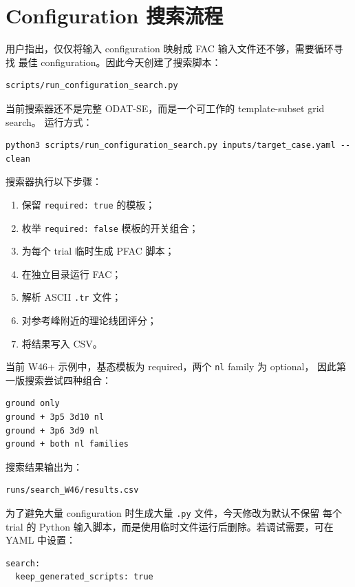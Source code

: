 \documentclass[11pt,a4paper]{article}
\begin{document}
\section{Configuration 搜索流程}

用户指出，仅仅将输入 configuration 映射成 FAC 输入文件还不够，需要循环寻找
最佳 configuration。因此今天创建了搜索脚本：

\begin{lstlisting}
scripts/run_configuration_search.py
\end{lstlisting}

当前搜索器还不是完整 ODAT-SE，而是一个可工作的 template-subset grid search。
运行方式：

\begin{lstlisting}
python3 scripts/run_configuration_search.py inputs/target_case.yaml --clean
\end{lstlisting}

搜索器执行以下步骤：

\begin{enumerate}
  \item 保留 \texttt{required: true} 的模板；
  \item 枚举 \texttt{required: false} 模板的开关组合；
  \item 为每个 trial 临时生成 PFAC 脚本；
  \item 在独立目录运行 FAC；
  \item 解析 ASCII \texttt{.tr} 文件；
  \item 对参考峰附近的理论线团评分；
  \item 将结果写入 CSV。
\end{enumerate}

当前 W46+ 示例中，基态模板为 required，两个 \texttt{nl} family 为 optional，
因此第一版搜索尝试四种组合：

\begin{lstlisting}
ground only
ground + 3p5 3d10 nl
ground + 3p6 3d9 nl
ground + both nl families
\end{lstlisting}

搜索结果输出为：

\begin{lstlisting}
runs/search_W46/results.csv
\end{lstlisting}

为了避免大量 configuration 时生成大量 \texttt{.py} 文件，今天修改为默认不保留
每个 trial 的 Python 输入脚本，而是使用临时文件运行后删除。若调试需要，可在
YAML 中设置：

\begin{lstlisting}
search:
  keep_generated_scripts: true
\end{lstlisting}
\end{document}
